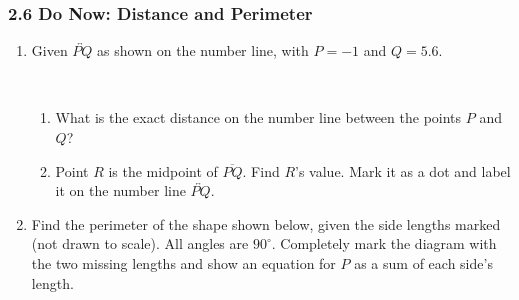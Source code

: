 \documentclass[12pt, twoside]{article}
\begin{document}
\subsubsection*{2.6 Do Now: Distance and Perimeter}
  \vspace{0.25cm}
  \begin{enumerate}


    \item Given $\overleftrightarrow{PQ}$ as shown on the number line, with $P=-1$ and $Q=5.6$. \\[20pt] %
     \\ \smallskip
    \begin{enumerate}
      \item What is the exact distance on the number line between the points $P$ and $Q$?  \vspace{2cm}
      \item Point $R$ is the midpoint of $\overline{PQ}$. Find $R$'s value. Mark it as a dot and label it on the number line $\overleftrightarrow{PQ}$.
    \end{enumerate}  \vspace{4cm}  

    \item Find the perimeter of the shape shown below, given the side lengths marked (not drawn to scale). All angles are $90^\circ$. Completely mark the diagram with the two missing lengths and show an equation for $P$ as a sum of each side's length.
    \vspace{1cm} 
    \begin{flushleft}
    \end{flushleft} \vspace{1cm}  


\end{enumerate}
\end{document}

